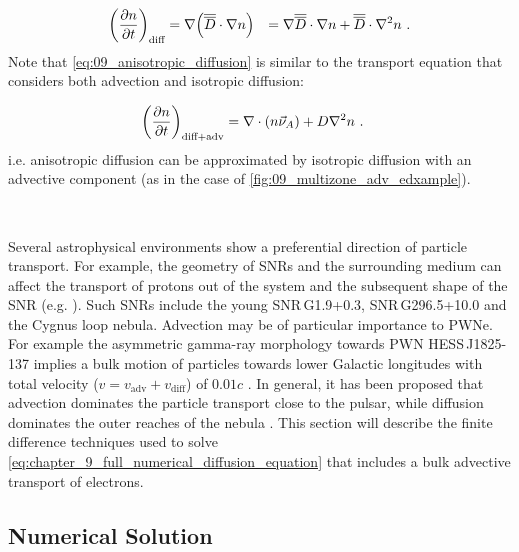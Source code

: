\begin{equation}
    \begin{aligned}
        \qty(\pdv{n}{t})_\text{diff}&=\nabla\qty(\overline{\overline{D}}\cdot\nabla n)
        &=\nabla\overline{\overline{D}}\cdot\nabla n+\overline{\overline{D}}\cdot\nabla^2 n\text{ .} 
    \end{aligned} \label{eq:09_anisotropic_diffusion}
\end{equation}
 \noindent Note that \autoref{eq:09_anisotropic_diffusion} is similar to the transport equation that considers both advection and isotropic diffusion:

 \begin{equation}
     \begin{aligned}
         \qty(\pdv{n}{t})_\text{diff+adv}&=\nabla\cdot\qty(n\vec{\nu}_A)+D\nabla^2 n\text{ .} 
     \end{aligned}
 \end{equation}
\noindent i.e. anisotropic diffusion can be approximated by isotropic diffusion with an advective component (as in the case of \autoref{fig:09_multizone_adv_edxample}).
\par~\par 
Several astrophysical environments show a preferential direction of particle transport. For example, the geometry of SNRs and the surrounding medium can affect the transport of protons out of the system and the subsequent shape of the SNR (e.g. \cite{2015MNRAS.450.3080M,2021ApJ...923..233G}). Such SNRs include the young \mbox{SNR\,G1.9+0.3}, \mbox{SNR\,G296.5+10.0} and the Cygnus loop nebula. Advection may be of particular importance to PWNe. For example the asymmetric gamma-ray morphology towards PWN \mbox{HESS\,J1825-137} \citep{2019A&A...621A.116H} implies a bulk motion of particles towards lower Galactic longitudes with total velocity ($v=v_\text{adv}+v_\text{diff}$) of $0.01c$ \citep{2019A&A...621A.116H}. In general, it has been proposed that advection dominates the particle transport close to the pulsar, while diffusion dominates the outer reaches of the nebula \citep{2020A&A...636A.113G,2021PhRvD.104l3017R}. This section will describe the finite difference techniques used to solve \autoref{eq:chapter_9_full_numerical_diffusion_equation} that includes a bulk advective transport of electrons.

\subsection{Numerical Solution} \label{sec:09_multizone_advection_num_sol}

